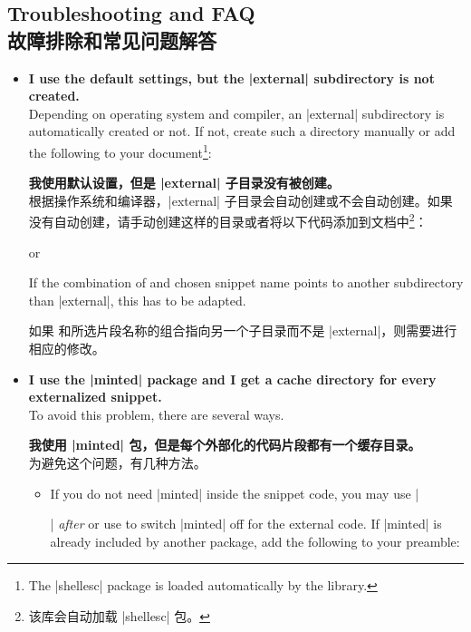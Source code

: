 \subsection{Troubleshooting and FAQ\\故障排除和常见问题解答}\label{subsec:external_troubleshooting}

\begin{itemize}
\item\textbf{I use the default settings, but the |external| subdirectory is
not created.}\\
Depending on operating system and compiler, an |external| subdirectory is
automatically created or not. If not, create such a directory manually
or add the following to your document\footnote{The |shellesc| package
is loaded automatically by the library.}:

\textbf{我使用默认设置，但是 |external| 子目录没有被创建。}\\
根据操作系统和编译器，|external| 子目录会自动创建或不会自动创建。如果没有自动创建，请手动创建这样的目录或者将以下代码添加到文档中\footnote{该库会自动加载 |shellesc| 包。}：
\begin{dispListing}
\end{dispListing}
or
\begin{dispListing}
\end{dispListing}
If the combination of  and chosen snippet
name points to another subdirectory than |external|, this has to be
adapted.

如果  和所选片段名称的组合指向另一个子目录而不是 |external|，则需要进行相应的修改。
\item\textbf{I use the |minted| package and I get a cache directory for
every externalized snippet.}\\
To avoid this problem, there are several ways.

\textbf{我使用 |minted| 包，但是每个外部化的代码片段都有一个缓存目录。}\\
为避免这个问题，有几种方法。
\begin{itemize}
  \item If you do not need |minted| inside the snippet code, you may use
    |\usepackage{minted}| \emph{after} 
    or use  to switch |minted| off for the external code.
    If |minted| is already included by another package, add the following to
    your preamble:


\end{itemize}
\end{itemize}
